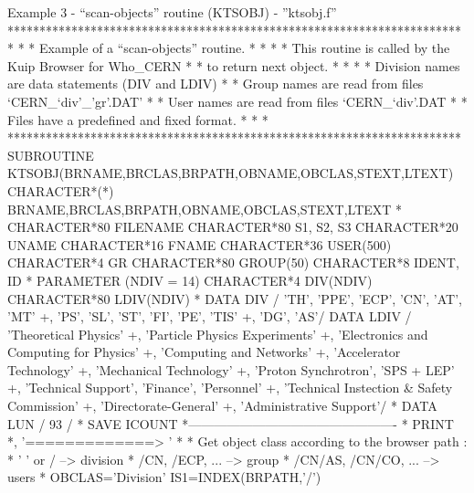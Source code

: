 \begin{XMPt} {Example 3 - ``scan-objects'' routine (KTSOBJ) -
''ktsobj.f''}
***********************************************************************
*                                                                     *
*   Example of a ``scan-objects'' routine.                            *
*                                                                     *
*   This routine is called by the Kuip Browser for Who_CERN           *
*   to return next object.                                            *
*                                                                     *
*   Division names are data statements (DIV and LDIV)                 *
*   Group names are read from files `CERN_`div'_'gr'.DAT'             *
*   User names are read from files `CERN_`div'.DAT                    *
*   Files have a predefined and fixed format.                         *
*                                                                     *
***********************************************************************
      SUBROUTINE KTSOBJ(BRNAME,BRCLAS,BRPATH,OBNAME,OBCLAS,STEXT,LTEXT)
      CHARACTER*(*) BRNAME,BRCLAS,BRPATH,OBNAME,OBCLAS,STEXT,LTEXT
*
      CHARACTER*80 FILENAME
      CHARACTER*80 S1, S2, S3
      CHARACTER*20 UNAME
      CHARACTER*16 FNAME
      CHARACTER*36 USER(500)
      CHARACTER*4  GR
      CHARACTER*80 GROUP(50)
      CHARACTER*8  IDENT, ID
*
      PARAMETER (NDIV = 14)
      CHARACTER*4 DIV(NDIV)
      CHARACTER*80 LDIV(NDIV)
*
      DATA DIV    / 'TH', 'PPE', 'ECP', 'CN', 'AT', 'MT'
     +,              'PS', 'SL', 'ST', 'FI', 'PE', 'TIS' 
     +,             'DG', 'AS'/
      DATA LDIV   / 'Theoretical Physics'
     +,             'Particle Physics Experiments'
     +,             'Electronics and Computing for Physics'
     +,             'Computing and Networks'
     +,             'Accelerator Technology'
     +,             'Mechanical Technology'  
     +,             'Proton Synchrotron', 'SPS + LEP' 
     +,             'Technical Support', 'Finance', 'Personnel'
     +,             'Technical Instection & Safety Commission'
     +,             'Directorate-General'
     +,             'Administrative Support'/
*
      DATA LUN     / 93 /
*
      SAVE ICOUNT\vspace{7pt}
*-------------------------------------------------
*     PRINT *, '=============> '
*
*     Get object class according to the browser path :
*     ' ' or /              --> division
*     /CN, /ECP, ...        --> group
*     /CN/AS, /CN/CO, ...   --> users
*
      OBCLAS='Division'
      IS1=INDEX(BRPATH,'/')

\end{XMPt}
